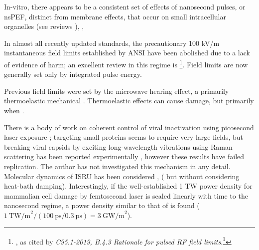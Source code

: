 \documentclass[paper.tex]{subfiles}
\begin{document}
\begin{multicols}{1}
In-vitro, there appears to be a consistent set of effects of nanosecond pulses, or nsPEF, distinct from membrane effects, that occur on small intracellular organelles (see reviews \cite{Penetration2016c} \cite{Effects2016} ), \cite{Bioeffects}, 

In almost all recently updated standards, the precautionary 100 kV/m instantaneous field limits established by ANSI have been abolished due to a lack of evidence of harm; an excellent review in this regime is \footnote{\cite{treatyelectromagnetic}, as cited by \textit{C95.1-2019, B.4.3 Rationale for pulsed RF field limits}.\footnote{That same review also contains the following, which highlights the incredible difficulty of obtaining reliable results in this field: "Dr. de Seze also described an experiment in which two sham groups were mistakenly run and a significant difference was found. Dr. Klauenberg noted another series of experiments he reviewed where experimental treatment groups did not vary while the sham groups compared to each other did resulting in a significant difference that was otherwise meaningless."}}. Field limits are now generally set only by integrated pulse energy.

Previous field limits were set by the microwave hearing effect, a primarily thermoelastic mechanical \cite{MICROWAVEINDUCED1975}. Thermoelastic effects can cause damage, but primarily when \cite{Thermoacoustic2017}\cite{MECHANICAL1968}. \cite{Radiation1996}

There is a body of work on coherent control of viral inactivation using picosecond laser exposure \cite{Maximum2010}; targeting small proteins seems to require very large fields\cite{Picosecond2016b}, but breaking viral capsids by exciting long-wavelength vibrations using Raman scattering has been reported experimentally \cite{Inactivation2007}\cite{Prospects2012}\cite{Studies2014}, however these results have failed replication\cite{No2011}. The author has not investigated this mechanism in any detail. Molecular dynamics of ISRU has been considered \cite{Maximum2010}, (\cite{Vibrational2009} but without considering heat-bath damping). Interestingly, if the well-established 1 TW power density\cite{Targeted2002} for mammalian cell damage by femtosecond laser is scaled linearly with time to the nanosecond regime, a power density similar to that of \cite{Repeated2020} is found ($1\ \text{TW/m}^2 / (100\ \text{ps} / 0.3\ \text{ps}) = 3\ \text{GW/m}^2$). 


\end{multicols}
\end{document}
